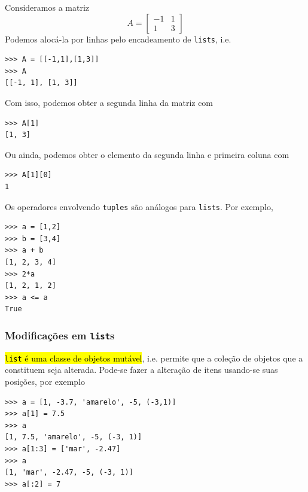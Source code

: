\begin{ex}
  Consideramos a matriz
  \begin{equation}
    A =
    \begin{bmatrix}
      -1 & 1 \\
      1 & 3 
    \end{bmatrix}
  \end{equation}
  Podemos alocá-la por linhas pelo encadeamento de \lstinline+lists+, i.e.

\begin{lstlisting}
>>> A = [[-1,1],[1,3]]
>>> A
[[-1, 1], [1, 3]]
\end{lstlisting}

Com isso, podemos obter a segunda linha da matriz com

\begin{lstlisting}
>>> A[1]
[1, 3]
\end{lstlisting}

Ou ainda, podemos obter o elemento da segunda linha  e primeira coluna com

\begin{lstlisting}
>>> A[1][0]
1
\end{lstlisting}

\end{ex}

\begin{obs}
  Os operadores envolvendo \lstinline+tuples+ são análogos para \lstinline+lists+. Por exemplo,

\begin{lstlisting}
>>> a = [1,2]
>>> b = [3,4]
>>> a + b
[1, 2, 3, 4]
>>> 2*a
[1, 2, 1, 2]
>>> a <= a
True
\end{lstlisting}

\end{obs}

\subsubsection{Modificações em \lstinline+list+s}

\hl{\texttt{list} é uma classe de objetos mutável}, i.e. permite que a coleção de objetos que a constituem seja alterada. Pode-se fazer a alteração de itens usando-se suas posições, por exemplo

\begin{lstlisting}
>>> a = [1, -3.7, 'amarelo', -5, (-3,1)] 
>>> a[1] = 7.5
>>> a
[1, 7.5, 'amarelo', -5, (-3, 1)]
>>> a[1:3] = ['mar', -2.47]
>>> a
[1, 'mar', -2.47, -5, (-3, 1)]
>>> a[:2] = 7
\end{lstlisting}


